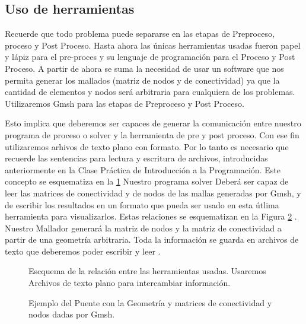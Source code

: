 \subsection{Uso de herramientas}

Recuerde que todo problema puede separarse en las etapas de 
Preproceso, proceso y Post Proceso. Hasta ahora las únicas 
herramientas usadas fueron papel y lápiz para el pre-proces
y su lenguaje de programación para el Proceso y Post Proceso. 
A partir de ahora se suma la necesidad de usar un software
que nos permita generar los mallados (matriz de nodos y de 
conectividad) ya que la cantidad de elementos y nodos será 
arbitraria para cualquiera de los problemas. Utilizaremos
Gmsh para las etapas de Preproceso y Post Proceso.

Esto implica que deberemos ser capaces de generar la 
comunicación entre nuestro programa de proceso o solver
y la herramienta de pre y post proceso. Con ese 
fin utilizaremos arhivos de texto plano con formato. 
Por lo tanto es necesario que recuerde las sentencias para
lectura y escritura de archivos, introducidas anteriormente en
la Clase Práctica de Introducción a la Programación. Este 
concepto se esquematiza en la \ref{FiguraComunicarHerramientas}
Nuestro programa solver Deberá ser capaz de leer las 
matrices de conectividad y de nodos de las mallas generadas
por Gmsh, y de escribir los resultados en un formato que 
pueda ser usado en esta útlima herramienta para visualizarlos.
Estas relaciones se esquematizan en la Figura 
\ref{FiguraFlujoTrabajo} .
Nuestro Mallador generará la matriz de nodos y 
  la matriz de conectividad a partir de una geometría 
  arbitraria. Toda la información se guarda en archivos 
  de texto que deberemos poder escribir y leer .




\begin{figure}
  \caption{Escquema de la relación entre las herramientas 
  usadas. Usaremos Archivos de texto plano para intercambiar
  información. \label{FiguraComunicarHerramientas} }

\end{figure}

\begin{figure}
  \caption{ Ejemplo del Puente con la Geometría y
  matrices de conectividad y nodos dadas por Gmsh.
  \label{FiguraFlujoTrabajo}
  }
\end{figure}


